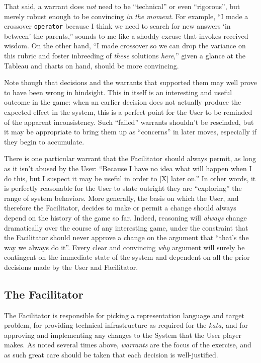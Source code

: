 That said, a warrant does \emph{not} need to be ``technical'' or even ``rigorous'', but merely robust enough to be convincing \emph{in the moment}. For example, ``I made a crossover {\tt operator} because I think we need to search for new answers `in between' the parents,'' sounds to me like a shoddy excuse that invokes received wisdom. On the other hand, ``I made crossover so we can drop the variance on this rubric and foster inbreeding of \emph{these} solutions \emph{here},'' given a glance at the Tableau and charts on hand, should be more convincing.

Note though that decisions and the warrants that supported them may well prove to have been wrong in hindsight. This in itself is an interesting and useful outcome in the game: when an earlier decision does not actually produce the expected effect in the system, this is a perfect point for the User to be reminded of the apparent inconsistency. Such ``failed'' warrants shouldn't be rescinded, but it may be appropriate to bring them up as ``concerns'' in later moves, especially if they begin to accumulate.

There is one particular warrant that the Facilitator should always permit, as long as it isn't abused by the User: ``Because I have no idea what will happen when I do this, but I suspect it may be useful in order to [X] later on.'' In other words, it is perfectly reasonable for the User to state outright they are ``exploring'' the range of system behaviors. More generally, the basis on which the User, and therefore the Facilitator, decides to make or permit a change should always depend on the history of the game so far. Indeed,  reasoning will \emph{always} change dramatically over the course of any interesting game, under the constraint that the Facilitator should never approve a change on the argument that ``that's the way we always do it''. Every clear and convincing \emph{why} argument will surely be contingent on the immediate state of the system and dependent on all the prior decisions made by the User and Facilitator.

\subsection{The Facilitator}\hypertarget{the-facilitator}{}\label{the-facilitator}

The Facilitator is responsible for picking a representation language and target problem, for providing  technical infrastructure as required for the \emph{kata}, and for approving and implementing any changes to the System that the User player makes. As noted several times above, \emph{warrants} are the focus of the exercise, and as such great care should be taken that each decision is well-justified.

